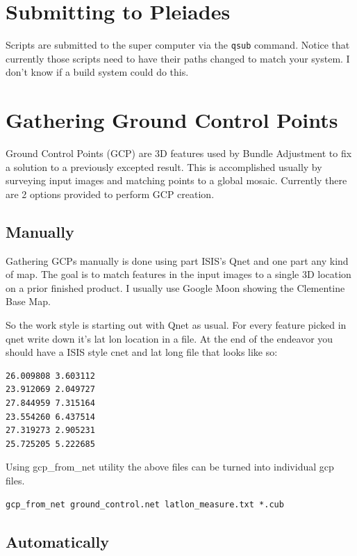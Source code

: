 \documentclass[12pt]{article}
\begin{document}
\section*{Submitting to Pleiades}

Scripts are submitted to the super computer via the \verb#qsub# command. Notice that currently those scripts need to have their paths changed to match your system. I don't know if a build system could do this.

\section{Gathering Ground Control Points}

Ground Control Points (GCP) are 3D features used by Bundle Adjustment to fix
a solution to a previously excepted result. This is accomplished
usually by surveying input images and matching points to a global
mosaic. Currently there are 2 options provided to perform GCP creation.

\subsection*{Manually}

Gathering GCPs manually is done using part ISIS's Qnet and one part
any kind of map. The goal is to match features in the input images to
a single 3D location on a prior finished product. I usually use Google
Moon showing the Clementine Base Map.

So the work style is starting out with Qnet as usual. For every feature picked in qnet write down it's lat lon location in a file. At the end of the endeavor you should have a ISIS style cnet and lat long file that looks like so:

\begin{verbatim}
26.009808 3.603112
23.912069 2.049727
27.844959 7.315164
23.554260 6.437514
27.319273 2.905231
25.725205 5.222685
\end{verbatim}

Using gcp\_from\_net utility the above files can be turned into individual gcp files.

\begin{verbatim}
gcp_from_net ground_control.net latlon_measure.txt *.cub
\end{verbatim}

\subsection*{Automatically}
\end{document}
